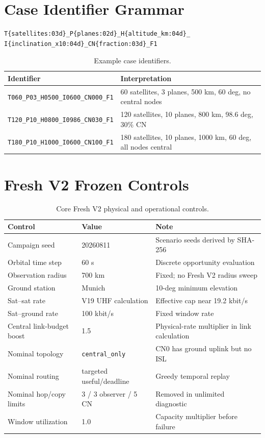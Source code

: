 \section{Case Identifier Grammar}

\begin{lstlisting}
T{satellites:03d}_P{planes:02d}_H{altitude_km:04d}_
I{inclination_x10:04d}_CN{fraction:03d}_F1
\end{lstlisting}

\begin{table}[htbp]
\centering
\caption{Example case identifiers.}
\label{tab:id_examples}
\begin{tabularx}{\textwidth}{L{0.50\textwidth}Y}
\toprule
Identifier & Interpretation \\
\midrule
\texttt{T060\_P03\_H0500\_I0600\_CN000\_F1} & 60 satellites, 3 planes, 500 km, 60 deg, no central nodes \\
\texttt{T120\_P10\_H0800\_I0986\_CN030\_F1} & 120 satellites, 10 planes, 800 km, 98.6 deg, 30\% CN \\
\texttt{T180\_P10\_H1000\_I0600\_CN100\_F1} & 180 satellites, 10 planes, 1000 km, 60 deg, all nodes central \\
\bottomrule
\end{tabularx}
\end{table}

\section{Fresh V2 Frozen Controls}

\begin{table}[htbp]
\centering
\caption{Core Fresh V2 physical and operational controls.}
\label{tab:fresh_controls_appendix}
\begin{tabularx}{\textwidth}{L{0.38\textwidth}L{0.25\textwidth}Y}
\toprule
Control & Value & Note \\
\midrule
Campaign seed & 20260811 & Scenario seeds derived by SHA-256 \\
Orbital time step & 60 s & Discrete opportunity evaluation \\
Observation radius & 700 km & Fixed; no Fresh V2 radius sweep \\
Ground station & Munich & 10-deg minimum elevation \\
Sat--sat rate & V19 UHF calculation & Effective cap near 19.2 kbit/s \\
Sat--ground rate & 100 kbit/s & Fixed window rate \\
Central link-budget boost & 1.5 & Physical-rate multiplier in link calculation \\
Nominal topology & \texttt{central\_only} & CN0 has ground uplink but no ISL \\
Nominal routing & targeted useful/deadline & Greedy temporal replay \\
Nominal hop/copy limits & 3 / 3 observer / 5 CN & Removed in unlimited diagnostic \\
Window utilization & 1.0 & Capacity multiplier before failure \\
\bottomrule
\end{tabularx}
\end{table}

